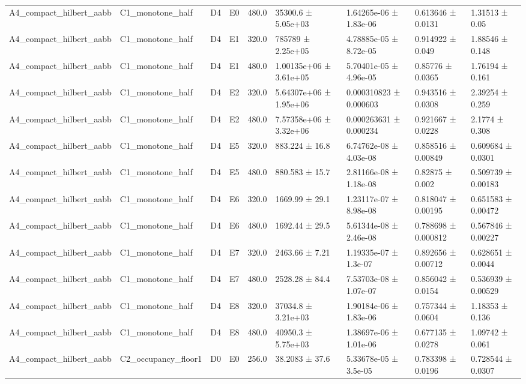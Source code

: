 \begin{table}
\begin{tabular}{lllllllll}
A4\_compact\_hilbert\_aabb & C1\_monotone\_half & D4 & E0 & 480.0 & 35300.6 ± 5.05e+03 & 1.64265e-06 ± 1.83e-06 & 0.613646 ± 0.0131 & 1.31513 ± 0.05 \\
A4\_compact\_hilbert\_aabb & C1\_monotone\_half & D4 & E1 & 320.0 & 785789 ± 2.25e+05 & 4.78885e-05 ± 8.72e-05 & 0.914922 ± 0.049 & 1.88546 ± 0.148 \\
A4\_compact\_hilbert\_aabb & C1\_monotone\_half & D4 & E1 & 480.0 & 1.00135e+06 ± 3.61e+05 & 5.70401e-05 ± 4.96e-05 & 0.85776 ± 0.0365 & 1.76194 ± 0.161 \\
A4\_compact\_hilbert\_aabb & C1\_monotone\_half & D4 & E2 & 320.0 & 5.64307e+06 ± 1.95e+06 & 0.000310823 ± 0.000603 & 0.943516 ± 0.0308 & 2.39254 ± 0.259 \\
A4\_compact\_hilbert\_aabb & C1\_monotone\_half & D4 & E2 & 480.0 & 7.57358e+06 ± 3.32e+06 & 0.000263631 ± 0.000234 & 0.921667 ± 0.0228 & 2.1774 ± 0.308 \\
A4\_compact\_hilbert\_aabb & C1\_monotone\_half & D4 & E5 & 320.0 & 883.224 ± 16.8 & 6.74762e-08 ± 4.03e-08 & 0.858516 ± 0.00849 & 0.609684 ± 0.0301 \\
A4\_compact\_hilbert\_aabb & C1\_monotone\_half & D4 & E5 & 480.0 & 880.583 ± 15.7 & 2.81166e-08 ± 1.18e-08 & 0.82875 ± 0.002 & 0.509739 ± 0.00183 \\
A4\_compact\_hilbert\_aabb & C1\_monotone\_half & D4 & E6 & 320.0 & 1669.99 ± 29.1 & 1.23117e-07 ± 8.98e-08 & 0.818047 ± 0.00195 & 0.651583 ± 0.00472 \\
A4\_compact\_hilbert\_aabb & C1\_monotone\_half & D4 & E6 & 480.0 & 1692.44 ± 29.5 & 5.61344e-08 ± 2.46e-08 & 0.788698 ± 0.000812 & 0.567846 ± 0.00227 \\
A4\_compact\_hilbert\_aabb & C1\_monotone\_half & D4 & E7 & 320.0 & 2463.66 ± 7.21 & 1.19335e-07 ± 1.3e-07 & 0.892656 ± 0.00712 & 0.628651 ± 0.0044 \\
A4\_compact\_hilbert\_aabb & C1\_monotone\_half & D4 & E7 & 480.0 & 2528.28 ± 84.4 & 7.53703e-08 ± 1.07e-07 & 0.856042 ± 0.0154 & 0.536939 ± 0.00529 \\
A4\_compact\_hilbert\_aabb & C1\_monotone\_half & D4 & E8 & 320.0 & 37034.8 ± 3.21e+03 & 1.90184e-06 ± 1.83e-06 & 0.757344 ± 0.0604 & 1.18353 ± 0.136 \\
A4\_compact\_hilbert\_aabb & C1\_monotone\_half & D4 & E8 & 480.0 & 40950.3 ± 5.75e+03 & 1.38697e-06 ± 1.01e-06 & 0.677135 ± 0.0278 & 1.09742 ± 0.061 \\
A4\_compact\_hilbert\_aabb & C2\_occupancy\_floor1 & D0 & E0 & 256.0 & 38.2083 ± 37.6 & 5.33678e-05 ± 3.5e-05 & 0.783398 ± 0.0196 & 0.728544 ± 0.0307 \\

\end{tabular}
\end{table}
